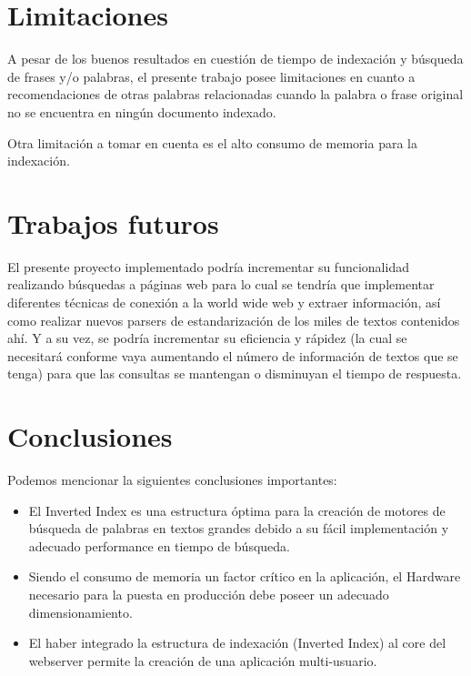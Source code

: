 \documentclass[a4paper]{article}
\begin{document}
\section{Limitaciones}

A pesar de los buenos resultados en cuestión de tiempo de indexación y búsqueda de frases y/o palabras, el presente trabajo posee limitaciones en cuanto a recomendaciones de otras palabras relacionadas cuando la palabra o frase original no se encuentra en ningún documento indexado.

Otra limitación a tomar en cuenta es el alto consumo de memoria para la indexación.

\section{Trabajos futuros}

El presente proyecto implementado podría incrementar su funcionalidad realizando búsquedas a páginas web para lo cual se tendría que implementar diferentes técnicas de conexión a la world wide web y extraer información, así como realizar nuevos parsers de estandarización de los miles de textos contenidos ahí. Y a su vez, se podría incrementar su eficiencia y rápidez (la cual se necesitará conforme vaya aumentando el número de información de textos que se tenga) para que las consultas se mantengan o disminuyan el tiempo de respuesta.

\section{Conclusiones}

Podemos mencionar la siguientes conclusiones importantes:

\begin{itemize}

    \item El Inverted Index es una estructura óptima para la creación de motores de búsqueda de palabras en textos grandes debido a su fácil implementación y adecuado performance en tiempo de búsqueda.
    
    \item Siendo el consumo de memoria un factor crítico en la aplicación, el Hardware necesario para la puesta en producción debe poseer un adecuado dimensionamiento.
    
    \item El haber integrado la estructura de indexación (Inverted Index) al core del webserver permite la creación de una aplicación multi-usuario.
    
    
\end{itemize}
\end{document}

